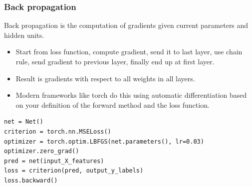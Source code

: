 \documentclass{beamer}
\begin{document}
\begin{frame}[fragile]
  \frametitle{Back propagation}
Back propagation is the computation of gradients given current
parameters and hidden units.
\begin{itemize}
\item Start from loss function, compute gradient, send it to last
  layer, use chain rule, send gradient to previous layer, finally end
  up at first layer.
\item Result is gradients with respect to all weights in all layers.
\item Modern frameworks like torch do this using automatic
  differentiation based on your definition of the forward method and
  the loss function.
\end{itemize}

\begin{verbatim}
net = Net()
criterion = torch.nn.MSELoss()
optimizer = torch.optim.LBFGS(net.parameters(), lr=0.03)
optimizer.zero_grad()
pred = net(input_X_features)
loss = criterion(pred, output_y_labels)
loss.backward()
\end{verbatim}

\end{frame}
\end{document}
